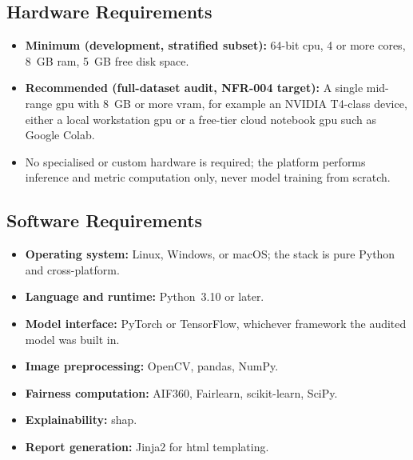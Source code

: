 \subsection{Hardware Requirements}
\begin{itemize}
    \item \textbf{Minimum (development, stratified subset):} 64-bit \gls{cpu}, 4 or more cores, 8~GB \gls{ram}, 5~GB free disk space.
    \item \textbf{Recommended (full-dataset audit, NFR-004 target):} A single mid-range \gls{gpu} with 8~GB or more \gls{vram}, for example an NVIDIA T4-class device, either a local workstation \gls{gpu} or a free-tier cloud notebook \gls{gpu} such as Google Colab.
    \item No specialised or custom hardware is required; the platform performs inference and metric computation only, never model training from scratch.
\end{itemize}

\subsection{Software Requirements}
\begin{itemize}
    \item \textbf{Operating system:} Linux, Windows, or macOS; the stack is pure Python and cross-platform.
    \item \textbf{Language and runtime:} Python~3.10 or later.
    \item \textbf{Model interface:} PyTorch or TensorFlow, whichever framework the audited model was built in.
    \item \textbf{Image preprocessing:} OpenCV, pandas, NumPy.
    \item \textbf{Fairness computation:} AIF360, Fairlearn, scikit-learn, SciPy.
    \item \textbf{Explainability:} \gls{shap}.
    \item \textbf{Report generation:} Jinja2 for \gls{html} templating.
\end{itemize}
